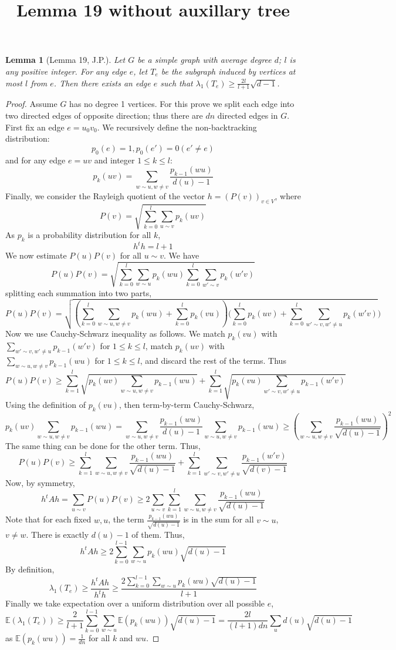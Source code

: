 \documentclass{article}
\title{Lemma 19 without auxillary tree}
\theoremstyle{definition} %
\theoremstyle{plain} %
\newtheorem{lemma}{Lemma}
\begin{document}
\maketitle
\begin{lemma}[Lemma 19, J.P.]
Let $G$ be a simple graph with average degree $d$; $l$ is any positive integer. For any edge $e$, let $T_e$ be the subgraph induced by vertices at most $l$ from $e$. Then there exists an edge $e$ such that $\lambda_1(T_e) \geq \frac{2l}{l+1}\sqrt{d-1}$.
\end{lemma}
\begin{proof}
Assume $G$ has no degree 1 vertices. For this prove we split each edge into two directed edges of opposite direction; thus there are $dn$ directed edges in $G$. First fix an edge $e = {u_0v_0}$. We recursively define the non-backtracking distribution:
$$p_0(e) = 1, p_0(e') = 0(e'\neq e)$$
and for any edge $e = uv$ and integer $1\leq k\leq l$:
$$p_k(uv) = \sum_{w\sim u, w\neq v} \frac{p_{k - 1}(wu)}{d(u) - 1}$$
Finally, we consider the Rayleigh quotient of the vector $h = (P(v))_{v\in V}$, where
$$P(v) = \sqrt{\sum_{k = 0}^l\sum_{u\sim v} p_k(uv)}$$
As $p_k$ is a probability distribution for all $k$,
$$h^th = l+1$$
We now estimate $P(u)P(v)$ for all $u\sim v$. We have
$$P(u)P(v) = \sqrt{ \sum_{k = 0}^l\sum_{w\sim u} p_k(wu) \sum_{k = 0}^l\sum_{w'\sim v} p_k(w'v)}$$
splitting each summation into two parts,
$$P(u)P(v) = \sqrt{ (\sum_{k = 0}^l\sum_{w\sim u, w\neq v} p_k(wu) + \sum_{k = 0}^lp_k(vu))(\sum_{k = 0}^lp_k(uv) + \sum_{k = 0}^l\sum_{w'\sim v, w'\neq u} p_k(w'v) })$$
Now we use Cauchy-Schwarz inequality as follows. We match $p_k(vu)$ with $\sum_{w'\sim v, w'\neq u} p_{k-1}(w'v)$ for $1\leq k\leq l$, match $p_{k}(uv)$ with $\sum_{w\sim u, w\neq v} p_{k-1}(wu)$ for $1\leq k\leq l$, and discard the rest of the terms. Thus
$$P(u)P(v) \geq \sum_{k = 1}^l \sqrt{p_{k}(uv)\sum_{w\sim u, w\neq v} p_{k-1}(wu)} + \sum_{k = 1}^l\sqrt{p_k(vu)\sum_{w'\sim v, w'\neq u} p_{k-1}(w'v)}$$
Using the definition of $p_k(vu)$, then term-by-term Cauchy-Schwarz,
$$p_{k}(uv)\sum_{w\sim u, w\neq v} p_{k-1}(wu) = \sum_{w\sim u, w\neq v} \frac{p_{k - 1}(wu)}{d(u) - 1}\sum_{w\sim u, w\neq v} p_{k-1}(wu) \geq (\sum_{w\sim u, w\neq v} \frac{p_{k - 1}(wu)}{\sqrt{d(u) - 1}})^2$$
The same thing can be done for the other term. Thus,
$$P(u)P(v) \geq \sum_{k = 1}^l\sum_{w\sim u, w\neq v} \frac{p_{k - 1}(wu)}{\sqrt{d(u) - 1}} + \sum_{k = 1}^l\sum_{w'\sim v, w'\neq u} \frac{p_{k - 1}(w'v)}{\sqrt{d(v) - 1}}$$
Now, by symmetry,
$$h^tAh = \sum_{u\sim v} P(u)P(v) \geq 2\sum_{u\sim v}\sum_{k = 1}^l\sum_{w\sim u, w\neq v} \frac{p_{k - 1}(wu)}{\sqrt{d(u) - 1}}$$
Note that for each fixed $w,u$, the term $\frac{p_{k - 1}(wu)}{\sqrt{d(u) - 1}}$ is in the sum for all $v\sim u$, $v\neq w$. There is exactly $d(u) - 1$ of them. Thus,
$$h^tAh \geq 2\sum_{k = 0}^{l-1}\sum_{w\sim u} p_k(wu)\sqrt{d(u) - 1}$$
By definition,
$$\lambda_1(T_e) \geq \frac{h^tAh}{h^th}\geq \frac{2\sum_{k = 0}^{l-1}\sum_{w\sim u} p_k(wu)\sqrt{d(u) - 1}}{l+1}$$
Finally we take expectation over a uniform distribution over all possible $e$,
$$\mathbb{E}(\lambda_1(T_e)) \geq \frac{2}{l+1}\sum_{k = 0}^{l-1}\sum_{w\sim u} \mathbb{E}(p_k(wu))\sqrt{d(u) - 1} = \frac{2l}{(l+1)dn}\sum_u d(u)\sqrt{d(u) - 1}$$
as $\mathbb{E}(p_k(wu)) = \frac{1}{dn}$ for all $k$ and $wu$.
\end{proof}
\end{document}
